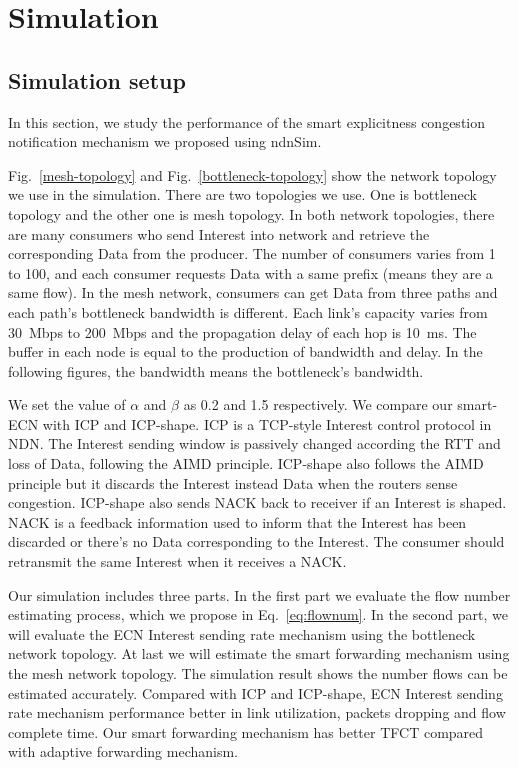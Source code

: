 
\section{Simulation}

\label{sec:simulation}

\subsection{Simulation setup}
In this section, we study the performance of the smart explicitness congestion notification mechanism we proposed using ndnSim\cite{ndnsimnet, ndnsim}.

Fig.~\ref{mesh-topology} and Fig.~\ref{bottleneck-topology} show the network topology we use in the simulation. There are two topologies we use. One is bottleneck topology and the other one is mesh topology. In both network topologies, there are many consumers who send Interest into network and retrieve the corresponding Data from the producer. The number of consumers varies from 1 to 100, and each consumer requests Data with a same prefix (means they are a same flow). In the mesh network, consumers can get Data from three paths and each path's bottleneck bandwidth is different. Each link's capacity varies from 30~Mbps to 200~Mbps and the propagation delay of each hop is 10~ms. The buffer in each node is equal to the production of bandwidth and delay. In the following figures, the bandwidth means the bottleneck's bandwidth.

We set the value of $\alpha$ and $\beta$ as 0.2 and 1.5 respectively. We compare our smart-ECN with ICP and ICP-shape. ICP is a TCP-style Interest control protocol in NDN. The Interest sending window is passively changed according the RTT and loss of Data, following the AIMD principle\cite{ICP}. ICP-shape also follows the AIMD principle but it discards the Interest instead Data when the routers sense congestion\cite{improveshape}. ICP-shape also sends NACK back to receiver if an Interest is shaped. NACK is a feedback information used to inform that the Interest has been discarded or there's no Data corresponding to the Interest. The consumer should retransmit the same Interest when it receives a NACK.

Our simulation includes three parts. In the first part we evaluate the flow number estimating process, which we propose in Eq.~\ref{eq:flownum}. In the second part, we will evaluate the ECN Interest sending rate mechanism using the bottleneck network topology. At last we will estimate the smart forwarding mechanism using the mesh network topology. The simulation result shows the number flows can be estimated accurately. Compared with ICP and ICP-shape, ECN Interest sending rate mechanism performance better in link utilization, packets dropping and flow complete time. Our smart forwarding mechanism has better TFCT compared with adaptive forwarding mechanism.

